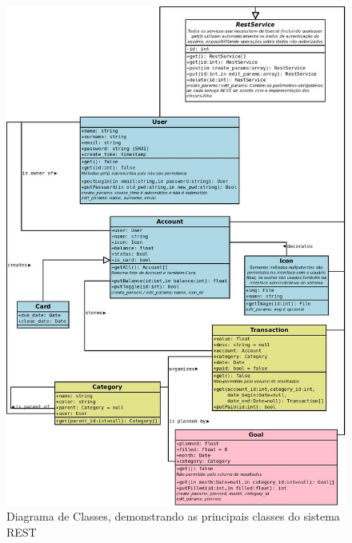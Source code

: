 \documentclass[a4paper]{abnt}
\begin{document}
\begin{figure}[!hb]
	\includegraphics[scale=0.47]{diagramas/classes.jpg}
	\caption{Diagrama de Classes, demonstrando as principais classes do sistema REST}
\end{figure}
\end{document}
